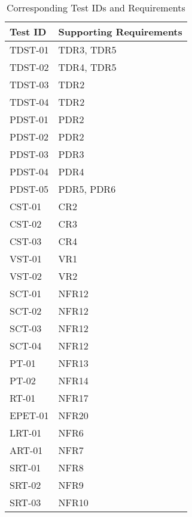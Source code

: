 \documentclass[12pt, titlepage]{article}
\begin{document}
\begin{longtable}{ |p{4cm}|p{8cm}|  }
  \caption{Corresponding Test IDs and Requirements}
  \label{tab:Table1}\\
  
  \hline
  \textbf{Test ID} & \textbf{Supporting Requirements}\\
  \hline
  TDST-01 &  TDR3, TDR5\\
  \hline
  TDST-02 &  TDR4, TDR5 \\
  \hline
  TDST-03 &  TDR2 \\
  \hline
  TDST-04 &  TDR2 \\
  \hline
  PDST-01 &  PDR2 \\
  \hline
  PDST-02 &  PDR2 \\
  \hline
  PDST-03 &  PDR3 \\
  \hline
  PDST-04 &  PDR4 \\
  \hline
  PDST-05 &  PDR5, PDR6 \\
  \hline
  CST-01 &  CR2 \\
  \hline
  CST-02 &  CR3 \\
  \hline
  CST-03 &  CR4 \\
  \hline
  VST-01 &  VR1 \\
  \hline
  VST-02&  VR2 \\
  \hline
  SCT-01 &  NFR12 \\
  \hline
  SCT-02 &  NFR12 \\
  \hline
  SCT-03 &  NFR12 \\
  \hline
  SCT-04 &  NFR12 \\
  \hline
  PT-01 & NFR13 \\
  \hline
  PT-02 & NFR14 \\
  \hline
  RT-01 & NFR17 \\
  \hline
  EPET-01 & NFR20 \\
  \hline
  LRT-01&  NFR6 \\
  \hline
  ART-01 & NFR7 \\
  \hline
  SRT-01 & NFR8 \\
  \hline
  SRT-02 & NFR9 \\
  \hline
  SRT-03 & NFR10 \\
  \hline
\end{longtable}

\newpage

\end{document}
